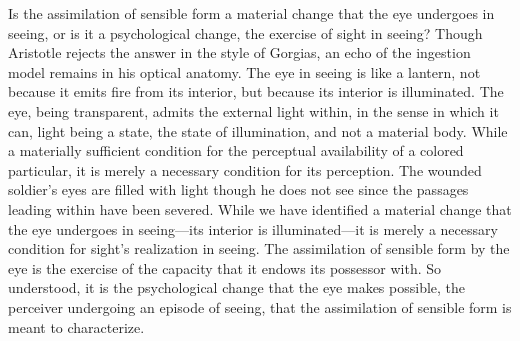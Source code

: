 Is the assimilation of sensible form a material change that the eye undergoes in seeing, or is it a psychological change, the exercise of sight in seeing? Though Aristotle rejects the answer in the style of Gorgias, an echo of the ingestion model remains in his optical anatomy. The eye in seeing is like a lantern, not because it emits fire from its interior, but because its interior is illuminated. The eye, being transparent, admits the external light within, in the sense in which it can, light being a state, the state of illumination, and not a material body. While a materially sufficient condition for the perceptual availability of a colored particular, it is merely a necessary condition for its perception. The wounded soldier's eyes are filled with light though he does not see since the passages leading within have been severed. While we have identified a material change that the eye undergoes in seeing---its interior is illuminated---it is merely a necessary condition for sight's realization in seeing. The assimilation of sensible form by the eye is the exercise of the capacity that it endows its possessor with. So understood, it is the psychological change that the eye makes possible, the perceiver undergoing an episode of seeing, that the assimilation of sensible form is meant to characterize.

